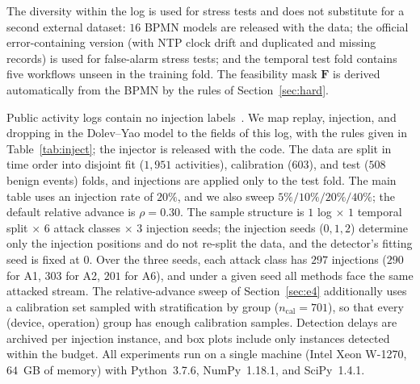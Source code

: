 \documentclass[manuscript,screen,review]{acmart}
\begin{document}
The diversity within the log is used for stress tests and does not substitute for a second external dataset: $16$ {BPMN} models are released with the data; the official error-containing version (with NTP clock drift and duplicated and missing records) is used for false-alarm stress tests; and the temporal test fold contains five workflows unseen in the training fold. The feasibility mask $\mathbf F$ is derived automatically from the {BPMN} by the rules of Section~\ref{sec:hard}.

Public activity logs contain no injection labels~\cite{conti2021testbeds,dobler2025datasets}. We map replay, injection, and dropping in the {Dolev--Yao} model to the fields of this log, with the rules given in Table~\ref{tab:inject}; the injector is released with the code. The data are split in time order into disjoint fit ($1{,}951$ activities), calibration ($603$), and test ($508$ benign events) folds, and injections are applied only to the test fold. The main table uses an injection rate of $20\%$, and we also sweep $5\%/10\%/20\%/40\%$; the default relative advance is $\rho=0.30$. The sample structure is $1$ log $\times$ $1$ temporal split $\times$ $6$ attack classes $\times$ $3$ injection seeds; the injection seeds ($0,1,2$) determine only the injection positions and do not re-split the data, and the detector's fitting seed is fixed at $0$. Over the three seeds, each attack class has $297$ injections ($290$ for {A1}, $303$ for {A2}, $201$ for {A6}), and under a given seed all methods face the same attacked stream. The relative-advance sweep of Section~\ref{sec:e4} additionally uses a calibration set sampled with stratification by group ($n_{\mathrm{cal}}=701$), so that every (device, operation) group has enough calibration samples. Detection delays are archived per injection instance, and box plots include only instances detected within the budget. All experiments run on a single machine ({Intel Xeon W-1270}, $64$~GB of memory) with {Python}~3.7.6, {NumPy}~1.18.1, and {SciPy}~1.4.1.
\end{document}
